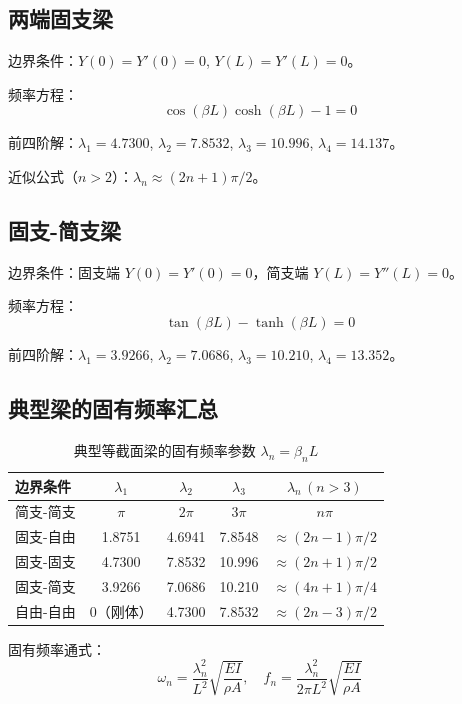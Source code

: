 \subsection{两端固支梁}

边界条件：$Y(0)=Y'(0)=0$, $Y(L)=Y'(L)=0$。

频率方程：
\[
\cos(\beta L)\cosh(\beta L) - 1 = 0
\]

前四阶解：$\lambda_1=4.7300$, $\lambda_2=7.8532$, $\lambda_3=10.996$, $\lambda_4=14.137$。

近似公式（$n>2$）：$\lambda_n \approx (2n+1)\pi/2$。

\subsection{固支-简支梁}

边界条件：固支端 $Y(0)=Y'(0)=0$，简支端 $Y(L)=Y''(L)=0$。

频率方程：
\[
\tan(\beta L) - \tanh(\beta L) = 0
\]

前四阶解：$\lambda_1=3.9266$, $\lambda_2=7.0686$, $\lambda_3=10.210$, $\lambda_4=13.352$。

\subsection{典型梁的固有频率汇总}

\begin{table}[H]\centering
\caption{典型等截面梁的固有频率参数 $\lambda_n = \beta_n L$}
\label{tab:beam-frequencies}
\begin{tabular}{lcccc}
\toprule
边界条件 & $\lambda_1$ & $\lambda_2$ & $\lambda_3$ & $\lambda_n\,(n>3)$ \\
\midrule
简支-简支 & $\pi$ & $2\pi$ & $3\pi$ & $n\pi$ \\
固支-自由 & 1.8751 & 4.6941 & 7.8548 & $\approx (2n-1)\pi/2$ \\
固支-固支 & 4.7300 & 7.8532 & 10.996 & $\approx (2n+1)\pi/2$ \\
固支-简支 & 3.9266 & 7.0686 & 10.210 & $\approx (4n+1)\pi/4$ \\
自由-自由 & 0（刚体） & 4.7300 & 7.8532 & $\approx (2n-3)\pi/2$ \\
\bottomrule
\end{tabular}
\end{table}

固有频率通式：
\[
\omega_n = \frac{\lambda_n^2}{L^2}\sqrt{\frac{EI}{\rho A}}, \quad f_n = \frac{\lambda_n^2}{2\pi L^2}\sqrt{\frac{EI}{\rho A}}
\]

